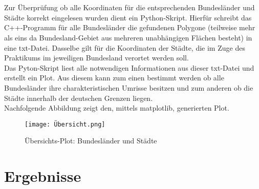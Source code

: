 \documentclass[12pt]{scrartcl}
\begin{document}
\ \\~\\

Zur Überprüfung ob alle Koordinaten für die entsprechenden Bundesländer und Städte korrekt eingelesen wurden dient ein Python-Skript.
Hierfür schreibt das C++-Programm für alle Bundesländer die gefundenen Polygone (teilweise mehr als eins da Bundesland-Gebiet aus mehreren unabhängigen Flächen besteht) in eine txt-Datei.
Dasselbe gilt für die Koordinaten der Städte, die im Zuge des Praktikums im jeweiligen Bundesland verortet werden soll.\\

Das Pyton-Skript liest alle notwendigen Informationen aus dieser txt-Datei und erstellt ein Plot. Aus diesem kann zum einen bestimmt werden ob alle Bundesländer ihre charakteristischen Umrisse besitzen
und zum anderen ob die Städte innerhalb der deutschen Grenzen liegen.\\
Nachfolgende Abbildung zeigt den, mittels matplotlib, generierten Plot.

\begin{figure}[ht]
    \centering
    \texttt{[image: Übersicht.png]}
    \caption{Übersichts-Plot: Bundesländer und Städte}
\end{figure}

\section{Ergebnisse}
\end{document}
